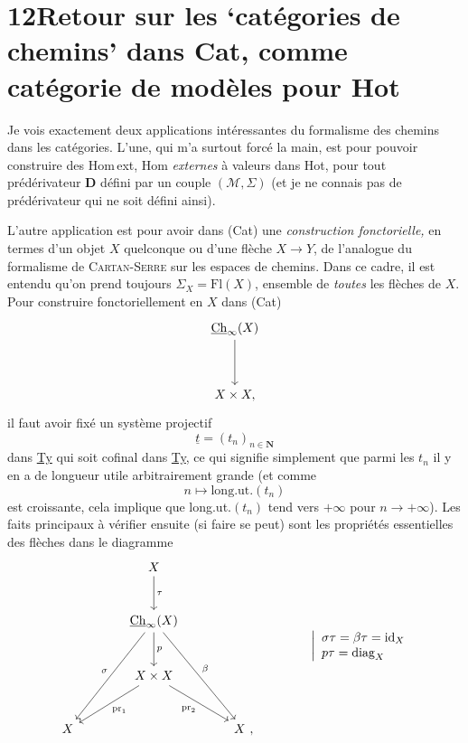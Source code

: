\documentclass[11pt]{article}
\newcommand{\printedpage}[1]{\marginpar{\footnotesize p.~#1}}
\newcommand{\msp}[1]{\marginpar{\footnotesize [#1]}}
\newcommand{\uCh}{\underline{\mathrm{Ch}}}
\begin{document}
\msp{page 137}

\section*{12\quad Retour sur les `catégories de chemins' dans \textmd{Cat}, comme catégorie de modèles pour \textmd{Hot}}

Je vois exactement deux applications intéressantes du formalisme des chemins dans les catégories. L'une, qui m'a surtout forcé la main, est pour pouvoir construire des Hom\,ext, Hom \textit{externes} à valeurs dans Hot, pour tout prédérivateur $\mathbf{D}$ défini par un couple $(\mathcal{M},\Sigma)$ (et je ne connais pas de prédérivateur qui ne soit défini ainsi).

L'autre application est pour avoir dans (Cat) une \textit{construction fonctorielle,} en termes d'un objet $X$ quelconque ou d'une flèche $X\longrightarrow Y$, de l'analogue du formalisme de \textsc{Cartan-Serre} sur les espaces de chemins. Dans ce cadre, il est entendu qu'on prend toujours $\Sigma_X=\mathrm{Fl}(X)$, ensemble de \textit{toutes} les flèches de $X$. Pour construire fonctoriellement en $X$ dans (Cat)
\[
\begin{tikzcd}[row sep=huge]
\uCh_\infty(X) \arrow[d] \\
X\times X,
\end{tikzcd}
\]
il faut avoir fixé un système projectif
\[
\underline{t}=(t_n)_{n\in\mathbf{N}}
\]
\msp{page 138}
dans \underline{Ty} qui soit cofinal dans \underline{Ty}, ce qui signifie simplement que parmi les $t_n$ il y en a de longueur utile arbitrairement grande (et comme
\[
n\longmapsto\mathrm{long.ut.}(t_n)
\]
est croissante, cela implique que long.ut.$(t_n)$ tend vers $+\infty$ pour $n\longrightarrow+\infty$). Les faits principaux à vérifier ensuite (si faire se peut) sont les propriétés essentielles des flèches dans le diagramme
\printedpage{86}
\[
\begin{tikzcd}[column sep=large, row sep=large]
& X \arrow[d, "\tau"] & \\
& \uCh_\infty(X) \arrow[d, "p"] \arrow[ddl, "\sigma"'] \arrow[ddr, "\beta"] & \\
& X\times X \arrow[dl, "\mathrm{pr}_1"] \arrow[dr, "\mathrm{pr}_2"'] & \\
X & & X\ ,
\end{tikzcd}
\qquad\qquad
\left|\begin{array}{l}
\sigma\tau=\beta\tau=\mathrm{id}_X\\
p\tau=\mathrm{diag}_X
\end{array}\right.
\]
\end{document}
